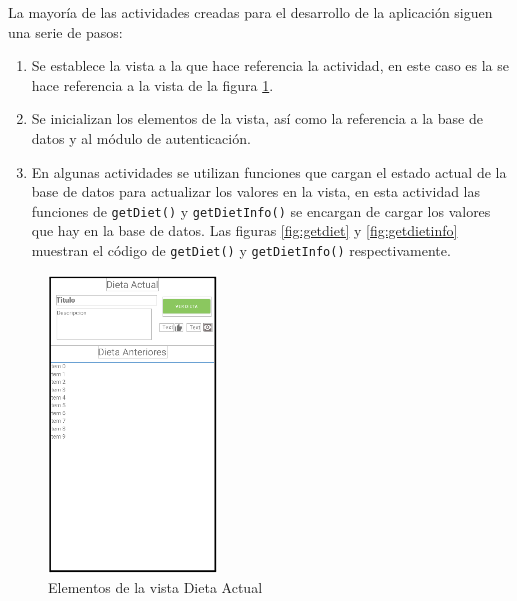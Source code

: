 La mayoría de las actividades creadas para el desarrollo de la aplicación siguen una serie de pasos: 
\begin{enumerate}
    \item Se establece la vista a la que hace referencia la actividad, en este caso es la se hace referencia a la vista de la figura \ref{fig:dietaview}.
    \item Se inicializan los elementos de la vista, así como la referencia a la base de datos y al módulo de autenticación.
    \item En algunas actividades se utilizan funciones que cargan el estado actual de la base de datos para actualizar los valores en la vista, en esta actividad las funciones de \texttt{getDiet()} y \texttt{getDietInfo()} se encargan de cargar los valores que hay en la base de datos. Las figuras \ref{fig:getdiet} y \ref{fig:getdietinfo} muestran el código de \texttt{getDiet()} y \texttt{getDietInfo()} respectivamente.
\end{enumerate}

\begin{figure}[H]
    \centering
    \includegraphics[width=0.4\textwidth]{Images/Capitulo7/dietaview.png}
        \caption{Elementos de la vista Dieta Actual}
    \label{fig:dietaview}
\end{figure}

